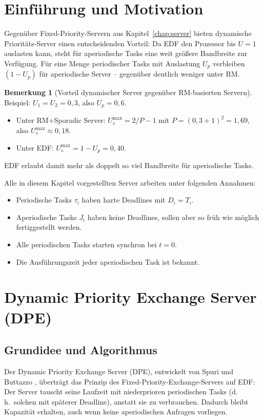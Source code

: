 ﻿\documentclass[a4paper,12pt]{report}
\theoremstyle{definition}
\newtheorem{bemerkung}{Bemerkung}[chapter]
\begin{document}
\section{Einführung und Motivation}

Gegenüber Fixed-Priority-Servern aus Kapitel~\ref{chap:server} bieten dynamische
Prioritäts-Server einen entscheidenden Vorteil: Da EDF den Prozessor bis $U=1$
auslasten kann, steht für aperiodische Tasks eine weit größere Bandbreite zur
Verfügung. Für eine Menge periodischer Tasks mit Auslastung $U_p$ verbleiben
$(1-U_p)$ für aperiodische Server -- gegenüber deutlich weniger unter RM.

\begin{bemerkung}[Vorteil dynamischer Server gegenüber RM-basierten Servern]
	Beispiel: $U_1 = U_2 = 0{,}3$, also $U_p = 0{,}6$.
	\begin{itemize}
		\item Unter RM+Sporadic Server: $U_s^{\max} = 2/P - 1$ mit
		      $P = (0{,}3+1)^2 = 1{,}69$, also $U_s^{\max} \approx 0{,}18$.
		\item Unter EDF: $U_s^{\max} = 1 - U_p = 0{,}40$.
	\end{itemize}
	EDF erlaubt damit mehr als doppelt so viel Bandbreite für aperiodische Tasks.
\end{bemerkung}

Alle in diesem Kapitel vorgestellten Server arbeiten unter folgenden Annahmen:
\begin{itemize}
	\item Periodische Tasks $\tau_i$ haben harte Deadlines mit $D_i = T_i$.
	\item Aperiodische Tasks $J_i$ haben keine Deadlines, sollen aber so früh wie
	      möglich fertiggestellt werden.
	\item Alle periodischen Tasks starten synchron bei $t=0$.
	\item Die Ausführungszeit jeder aperiodischen Task ist bekannt.
\end{itemize}

\section{Dynamic Priority Exchange Server (DPE)}

\subsection{Grundidee und Algorithmus}

Der Dynamic Priority Exchange Server (DPE), entwickelt von Spuri und Buttazzo
\cite{Spuri1996}, überträgt das Prinzip des Fixed-Priority-Exchange-Servers auf
EDF: Der Server tauscht seine Laufzeit mit niederprioren periodischen Tasks
(d.\,h.\ solchen mit späterer Deadline), anstatt sie zu verbrauchen. Dadurch
bleibt Kapazität erhalten, auch wenn keine aperiodischen Anfragen vorliegen.
\end{document}
